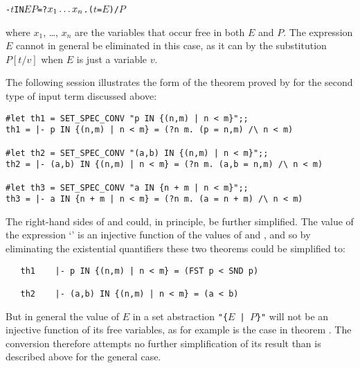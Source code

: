\begin{hol}\def\m#1{\mbox{\small$#1$}}\begin{alltt}
   {\vb}- \m{t} IN \lb\m{E} \vb \m{P}\rb = ?\m{x\sb{1}\dots x\sb{n}}. (\m{t} = \m{E}) /\bk \m{P}
\end{alltt}\end{hol}

\noindent where $x_1$, \dots, $x_n$ are the variables that occur free in both
$E$ and $P$. The expression $E$ cannot in general be eliminated in this case,
as it can by the substitution $P[t/v]$ when $E$ is just a variable $v$.

\pagebreak[3]

The following session illustrates the form of the theorem proved by
 for the second type of input term discussed above:

\setcounter{sessioncount}{1}
\begin{session}\begin{verbatim}
#let th1 = SET_SPEC_CONV "p IN {(n,m) | n < m}";;
th1 = |- p IN {(n,m) | n < m} = (?n m. (p = n,m) /\ n < m)

#let th2 = SET_SPEC_CONV "(a,b) IN {(n,m) | n < m}";;
th2 = |- (a,b) IN {(n,m) | n < m} = (?n m. (a,b = n,m) /\ n < m)

#let th3 = SET_SPEC_CONV "a IN {n + m | n < m}";;
th3 = |- a IN {n + m | n < m} = (?n m. (a = n + m) /\ n < m)
\end{verbatim}\end{session}

\noindent The right-hand sides of  and  could, in principle, be
further simplified.  The value of the expression `' is an injective
function of the values of  and , and so by eliminating the
existential quantifiers these two theorems could be simplified to:

\begin{hol}\begin{verbatim}
   th1    |- p IN {(n,m) | n < m} = (FST p < SND p)

   th2    |- (a,b) IN {(n,m) | n < m} = (a < b)
\end{verbatim}\end{hol}

\noindent But in general the value of {\small $E$} in a set abstraction
{\small\verb!"{!$E$\verb! | !$P$\verb!}"!} will not be an injective function of
its free variables, as for example is the case in theorem .  The
conversion  therefore attempts no further simplification of
its result than is described above for the general
case.%

